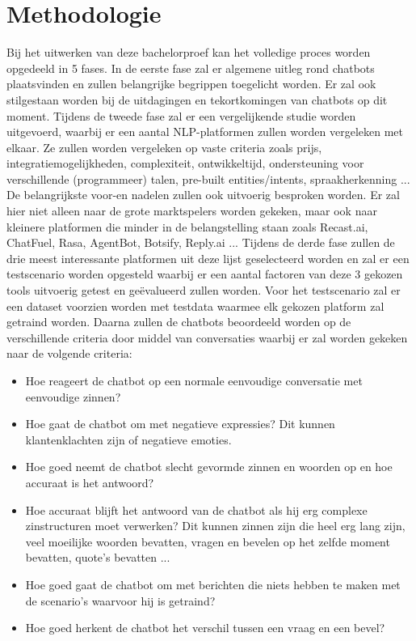 \section{Methodologie}
\label{sec:methodologie}

Bij het uitwerken van deze bachelorproef kan het volledige proces worden opgedeeld in 5 fases.
In de eerste fase zal er algemene uitleg rond chatbots plaatsvinden en zullen belangrijke begrippen toegelicht worden. Er zal ook stilgestaan worden bij de uitdagingen en tekortkomingen van chatbots op dit moment. Tijdens de tweede fase zal er een vergelijkende studie worden uitgevoerd, waarbij er een aantal NLP-platformen zullen worden vergeleken met elkaar. Ze zullen worden vergeleken op vaste criteria zoals prijs, integratiemogelijkheden, complexiteit, ontwikkeltijd, ondersteuning voor verschillende (programmeer) talen, pre-built entities/intents, spraakherkenning ... De belangrijkste voor-en nadelen zullen ook uitvoerig besproken worden. Er zal hier niet alleen naar de grote marktspelers worden gekeken, maar ook naar kleinere platformen die minder in de belangstelling staan zoals Recast.ai, ChatFuel, Rasa, AgentBot, Botsify, Reply.ai ... Tijdens de derde fase zullen de drie meest interessante platformen uit deze lijst geselecteerd worden en zal er een testscenario worden opgesteld waarbij er een aantal factoren van deze 3 gekozen tools uitvoerig getest en geëvalueerd zullen worden. Voor het testscenario zal er een dataset voorzien worden met testdata waarmee elk gekozen platform zal getraind worden. Daarna zullen de chatbots beoordeeld worden op de verschillende criteria door middel van conversaties waarbij er zal worden gekeken naar de volgende criteria:\bigskip

\begin{itemize}
    \item Hoe reageert de chatbot op een normale eenvoudige conversatie met eenvoudige zinnen?
    \item Hoe gaat de chatbot om met negatieve expressies? Dit kunnen klantenklachten zijn of negatieve emoties.
    \item Hoe goed neemt de chatbot slecht gevormde zinnen en woorden op en hoe accuraat is het antwoord?
    \item Hoe accuraat blijft het antwoord van de chatbot als hij erg complexe zinstructuren moet verwerken? Dit kunnen zinnen zijn die heel erg lang zijn, veel moeilijke woorden bevatten, vragen en bevelen op het zelfde moment bevatten, quote's bevatten ...
    \item Hoe goed gaat de chatbot om met berichten die niets hebben te maken met de scenario’s waarvoor hij is getraind?
    \item Hoe goed herkent de chatbot het verschil tussen een vraag en een bevel?
\end{itemize}

